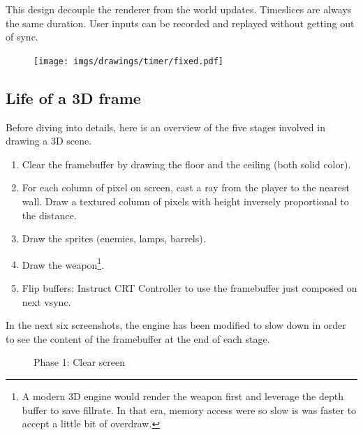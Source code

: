 \par
\begin{minipage}{\textwidth}
 
 \end{minipage}
\par
This design decouple the renderer from the world updates. Timeslices are always the same duration. User inputs can be recorded and replayed without getting out of sync.
\par
 \begin{figure}[H]
\centering
 \texttt{[image: imgs/drawings/timer/fixed.pdf]}
 
 \end{figure}

\subsection{Life of a 3D frame}
Before diving into details, here is an overview of the five stages involved in drawing a 3D scene.\\
\begin{enumerate}
 \item Clear the framebuffer by drawing the floor and the ceiling (both solid color).
 \item For each column of pixel on screen, cast a ray from the player to the nearest wall. Draw a textured column of pixels with height inversely proportional to the distance.
 \item Draw the sprites (enemies, lamps, barrels).
 \item Draw the weapon\footnote{A modern 3D engine would render the weapon first and leverage the depth buffer to save fillrate. In that era, memory access were so slow is was faster to accept a little bit of overdraw.}.	
 \item Flip buffers: Instruct CRT Controller to use the framebuffer just composed on next vsync.
\end{enumerate}
In the next six screenshots, the engine has been modified to slow down in order to see the content of the framebuffer at the end of each stage.\\
\begin{figure}[H]
\centering
 \caption{Phase 1: Clear screen}
 \end{figure}




